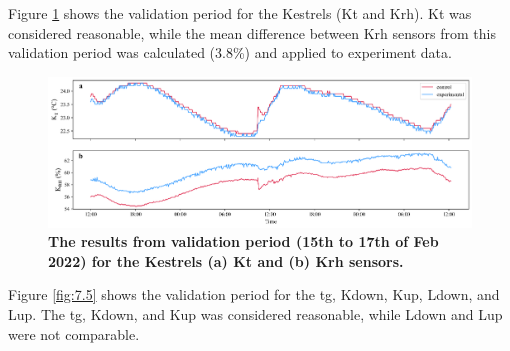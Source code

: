 \documentclass[final,3p,times,authoryear]{elsarticle}
\begin{document}
Figure \ref{fig:7.4} shows the validation period for the Kestrels (\gls{Kt} and \gls{Krh}). \gls{Kt} was considered reasonable, while the mean difference between \gls{Krh} sensors from this validation period was calculated (3.8\%) and applied to experiment data.

\begin{figure}
\centering
\includegraphics[trim={0 0 0 0},clip,scale=1.0]{pict019.png}
\caption{\bf The results from validation period (15th to 17th of Feb 2022) for the Kestrels (a) \gls{Kt} and (b) \gls{Krh} sensors.}
 \label{fig:7.4}
\end{figure}

Figure \ref{fig:7.5} shows the validation period for the \gls{tg}, \gls{Kdown}, \gls{Kup}, \gls{Ldown}, and \gls{Lup}. The \gls{tg}, \gls{Kdown}, and \gls{Kup} was considered reasonable, while \gls{Ldown} and \gls{Lup} were not comparable.
\end{document}
